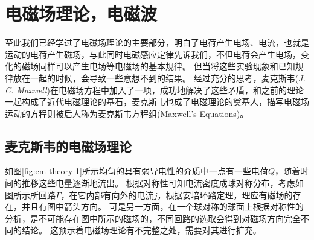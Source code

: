 
\chapter{电磁场理论，电磁波}
至此我们已经学过了电磁场理论的主要部分，明白了电荷产生电场、电流，也就是运动的电荷产生磁场，与此同时电磁感应定律先诉我们，不但电荷会产生电场，变化的磁场同样可以产生电场等电磁场的基本规律。
但当将这些实验现象和已知规律放在一起的时候，会导致一些意想不到的结果。
经过充分的思考，麦克斯韦(\textit{J. C. Maxwell})在电磁场方程中加入了一项，成功地解决了这些矛盾，和之前的理论一起构成了近代电磁理论的基石，麦克斯韦也成了电磁理论的奠基人，描写电磁场运动的方程则被后人称为{\heiti 麦克斯韦方程组}(Maxwell's Equations)。

\section{麦克斯韦的电磁场理论}


如图\ref{fig:em-theory-1}所示均匀的具有弱导电性的介质中一点有一些电荷$Q$，随着时间的推移这些电量逐渐地流出。
根据对称性可知电流密度成球对称分布，考虑如图所示所回路$\Gamma$，在它内部有向外的电流$j$，根据安培环路定理，理应有磁场的存在，并且有图中箭头方向。
可是另一方面，在一个球对称的球面上根据对称性的分析，是不可能存在图中所示的磁场的，不同回路的选取会得到对磁场方向完全不同的结论。
这预示着电磁场理论有不完整之处，需要对其进行扩充。

